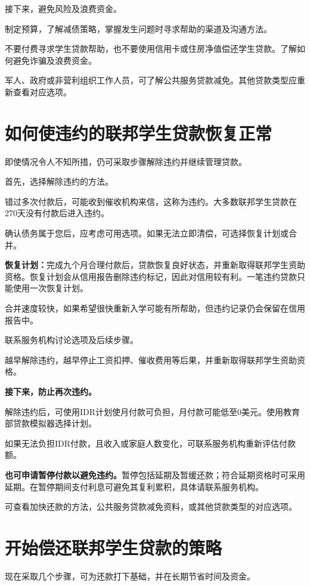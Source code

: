 \documentclass[UTF8,fontset=none,11pt,a4paper]{ctexart}
\begin{document}
接下来，避免风险及\allowbreak\mbox{浪费资金。}


制定预算，了解减债策略，掌握发生问题时寻求帮助的渠道及\allowbreak\mbox{沟通方法。}


不要付费寻求学生贷款帮助，也不要使用信用卡或住房净值偿还学生贷款。了解如何避免诈骗及\allowbreak\mbox{浪费资金。}


军人、政府或非营利组织工作人员，可了解公共服务贷款减免。其他贷款类型应重新查看\allowbreak\mbox{对应选项。}


\section*{如何使违约的联邦学生贷款恢复正常}
即使情况令人不知所措，仍可采取步骤解除违约并继续\allowbreak\mbox{管理贷款。}


首先，选择解除违\allowbreak\mbox{约的方法。}


错过多次付款后，可能收到催收机构来信，这称为违约。大多数联邦学生贷款在270天没有付款后\allowbreak\mbox{进入违约。}


确认债务属于您后，应考虑可用选项。如果无法立即清偿，可选择恢复计\allowbreak\mbox{划或合并。}


\textbf{恢复计划：}完成九个月合理付款后，贷款恢复良好状态，并重新取得联邦学生资助资格。恢复计划会从信用报告删除违约标记，因此对信用较有利。一笔违约贷款只能使用一次\allowbreak\mbox{恢复计划。}


合并速度较快，如果希望很快重新入学可能有所帮助，但违约记录仍会保留在信\allowbreak\mbox{用报告中。}


联系服务机构讨论选项及\allowbreak\mbox{后续步骤。}


越早解除违约，越早停止工资扣押、催收费用等后果，并重新取得联邦学生\allowbreak\mbox{资助资格。}


\textbf{接下来，防止再次违约。}


解除违约后，可使用IDR计划使月付款可负担，月付款可能低至0美元。使用教育部贷款模拟器\allowbreak\mbox{选择计划。}


如果无法负担IDR付款，且收入或家庭人数变化，可联系服务机构重新评\allowbreak\mbox{估付款额。}


\textbf{也可申请暂停付款以避免违约。}暂停包括延期及暂缓还款；符合延期资格时可采用延期。在暂停期间支付利息可避免其复利累积，具体请联系\allowbreak\mbox{服务机构。}


可查看加快还款的方法，公共服务贷款减免资料，或其他贷款类型的\allowbreak\mbox{对应选项。}


\section*{开始偿还联邦学生贷款的策略}
现在采取几个步骤，可为还款打下基础，并在长期节省时\allowbreak\mbox{间及资金。}
\end{document}
